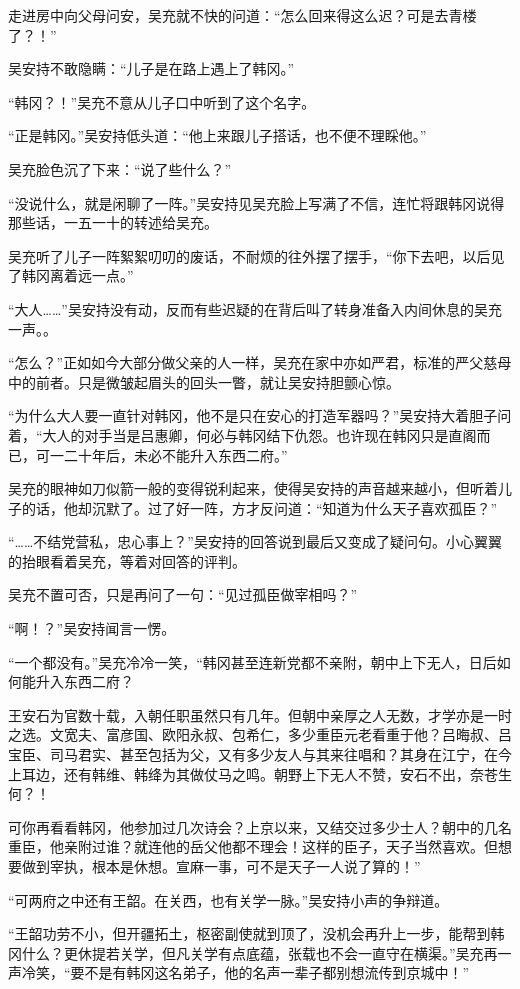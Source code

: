 走进房中向父母问安，吴充就不快的问道：“怎么回来得这么迟？可是去青楼了？！”

吴安持不敢隐瞒：“儿子是在路上遇上了韩冈。”

“韩冈？！”吴充不意从儿子口中听到了这个名字。

“正是韩冈。”吴安持低头道：“他上来跟儿子搭话，也不便不理睬他。”

吴充脸色沉了下来：“说了些什么？”

“没说什么，就是闲聊了一阵。”吴安持见吴充脸上写满了不信，连忙将跟韩冈说得那些话，一五一十的转述给吴充。

吴充听了儿子一阵絮絮叨叨的废话，不耐烦的往外摆了摆手，“你下去吧，以后见了韩冈离着远一点。”

“大人……”吴安持没有动，反而有些迟疑的在背后叫了转身准备入内间休息的吴充一声。。

“怎么？”正如如今大部分做父亲的人一样，吴充在家中亦如严君，标准的严父慈母中的前者。只是微皱起眉头的回头一瞥，就让吴安持胆颤心惊。

“为什么大人要一直针对韩冈，他不是只在安心的打造军器吗？”吴安持大着胆子问着，“大人的对手当是吕惠卿，何必与韩冈结下仇怨。也许现在韩冈只是直阁而已，可一二十年后，未必不能升入东西二府。”

吴充的眼神如刀似箭一般的变得锐利起来，使得吴安持的声音越来越小，但听着儿子的话，他却沉默了。过了好一阵，方才反问道：“知道为什么天子喜欢孤臣？”

“……不结党营私，忠心事上？”吴安持的回答说到最后又变成了疑问句。小心翼翼的抬眼看着吴充，等着对回答的评判。

吴充不置可否，只是再问了一句：“见过孤臣做宰相吗？”

“啊！？”吴安持闻言一愣。

“一个都没有。”吴充冷冷一笑，“韩冈甚至连新党都不亲附，朝中上下无人，日后如何能升入东西二府？

王安石为官数十载，入朝任职虽然只有几年。但朝中亲厚之人无数，才学亦是一时之选。文宽夫、富彦国、欧阳永叔、包希仁，多少重臣元老看重于他？吕晦叔、吕宝臣、司马君实、甚至包括为父，又有多少友人与其来往唱和？其身在江宁，在今上耳边，还有韩维、韩绛为其做仗马之鸣。朝野上下无人不赞，安石不出，奈苍生何？！

可你再看看韩冈，他参加过几次诗会？上京以来，又结交过多少士人？朝中的几名重臣，他亲附过谁？就连他的岳父他都不理会！这样的臣子，天子当然喜欢。但想要做到宰执，根本是休想。宣麻一事，可不是天子一人说了算的！”

“可两府之中还有王韶。在关西，也有关学一脉。”吴安持小声的争辩道。

“王韶功劳不小，但开疆拓土，枢密副使就到顶了，没机会再升上一步，能帮到韩冈什么？更休提若关学，但凡关学有点底蕴，张载也不会一直守在横渠。”吴充再一声冷笑，“要不是有韩冈这名弟子，他的名声一辈子都别想流传到京城中！”

